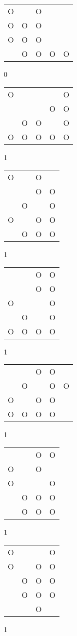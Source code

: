 \begin{tabular}{|m{0.2cm}m{0.2cm}m{0.2cm}m{0.2cm}m{0.2cm}|}\hline
O& &O& & \\
O&O&O& & \\
O&O&O& & \\
 &O&O&O&O\\
\hline\end{tabular}0
\begin{tabular}{|m{0.2cm}m{0.2cm}m{0.2cm}m{0.2cm}m{0.2cm}|}\hline
O& & & &O\\
 & & &O&O\\
 &O&O& &O\\
O&O&O&O&O\\
\hline\end{tabular}1
\begin{tabular}{|m{0.2cm}m{0.2cm}m{0.2cm}m{0.2cm}|}\hline
O& &O& \\
 & &O&O\\
 &O& &O\\
O& &O&O\\
 &O&O&O\\
\hline\end{tabular}1
\begin{tabular}{|m{0.2cm}m{0.2cm}m{0.2cm}m{0.2cm}|}\hline
 & &O&O\\
 & &O&O\\
O& & &O\\
 &O& &O\\
O&O&O&O\\
\hline\end{tabular}1
\begin{tabular}{|m{0.2cm}m{0.2cm}m{0.2cm}m{0.2cm}m{0.2cm}|}\hline
 & &O&O& \\
 &O& &O&O\\
O& &O&O& \\
O&O&O&O& \\
\hline\end{tabular}1
\begin{tabular}{|m{0.2cm}m{0.2cm}m{0.2cm}m{0.2cm}|}\hline
 & &O&O\\
O& &O& \\
O& & &O\\
 &O&O&O\\
 &O&O&O\\
\hline\end{tabular}1
\begin{tabular}{|m{0.2cm}m{0.2cm}m{0.2cm}m{0.2cm}|}\hline
O& & &O\\
O& &O&O\\
 &O&O&O\\
 &O&O&O\\
 & &O& \\
\hline\end{tabular}1
